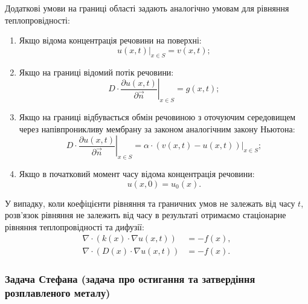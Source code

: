 Додаткові умови на границі області задають аналогічно умовам для рівняння теплопровідності:
\begin{enumerate}
	\item Якщо відома концентрація речовини на поверхні:
	\begin{equation}
		\left. u(x, t) \right|_{x \in S} = v(x, t);
	\end{equation}

	\item Якщо на границі відомий потік речовини:
	\begin{equation}
		\left. D \cdot \frac{\partial u(x, t)}{\partial \vec n} \right|_{x \in S} = g(x, t);
	\end{equation}

	\item Якщо на границі відбувається обмін речовиною з оточуючим середовищем через напівпроникливу мембрану за законом аналогічним закону Ньютона:
	\begin{equation}
		\left. D \cdot \frac{\partial u(x, t)}{\partial \vec n} \right|_{x \in S} = \alpha \cdot \left. ( v(x, t) - u(x, t) ) \right|_{x \in S};
	\end{equation}

	\item Якщо в початковий момент часу відома концентрація речовини:
	\begin{equation}
		u(x, 0) = u_0(x).
	\end{equation}
\end{enumerate}

\begin{remark}
	У випадку, коли коефіцієнти рівняння та граничних умов не залежать від часу $t$, розв'язок рівняння не залежить від часу в результаті отримаємо стаціонарне рівняння теплопровідності та дифузії:
	\begin{align}
		\nabla \cdot (k(x) \cdot \nabla u(x, t)) &= -f(x), \\
		\nabla \cdot (D(x) \cdot \nabla u(x, t)) &= -f(x).
	\end{align}
\end{remark}

\subsubsection{Задача Стефана (задача про остигання та затвердіння розплавленого металу)}


